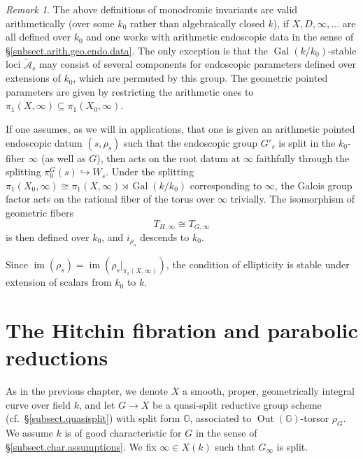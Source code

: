 \documentclass[openany]{amsbook}
\theoremstyle{definition}
\theoremstyle{remark}
\newtheorem{remark}[theorem]{Remark}
\numberwithin{equation}{section}
\newcommand{\G}{\mathbb{G}}
\newcommand{\cA}{\mathcal{A}}
\newcommand{\im}{\operatorname{im}}
\newcommand{\Gal}{\operatorname{Gal}}
\renewcommand{\-}{\operatorname{-}}
\newcommand{\Out}{\operatorname{Out}}
\newcommand{\ctA}{\widetilde{\cA}}
\begin{document}
\begin{remark}\label{rmk.arith.geo.data.correspond}
The above definitions of monodromic invariants are valid arithmetically (over some $k_0$ rather than algebraically closed $k$), if $X, D, \infty, \ldots$ are all defined over $k_0$ and one works with arithmetic endoscopic data in the sense of \S \ref{subsect.arith.geo.endo.data}. The only exception is that the $\Gal(k/k_0)$-stable loci $\ctA_s$ may consist of several components for endoscopic parameters defined over extensions of $k_0$, which are permuted by this group. The geometric pointed parameters are given by restricting the arithmetic ones to $\pi_1(X, \infty) \subseteq \pi_1(X_0, \infty)$. 

If one assumes, as we will in applications, that one is given an arithmetic pointed endoscopic datum $(s, \rho_s)$ such that the endoscopic group $G'_s$ is split in the $k_0$-fiber $\infty$ (as well as $G$), then acts on the root datum at $\infty$ faithfully through the splitting $\pi_0^G(s) \hookrightarrow W_s$. Under the splitting $\pi_1(X_0, \infty) \cong \pi_1(X, \infty) \rtimes \Gal(k/k_0)$ corresponding to $\infty$, the Galois group factor acts on the rational fiber of the torus over $\infty$ trivially. The isomorphism of geometric fibers $$T_{H, \infty} \cong T_{G, \infty}$$ is then defined over $k_0$, and $i_{\rho_s}$ descends to $k_0$.

Since $\im(\rho_s) = \im(\rho_s|_{\pi_1(X, \infty)})$, the condition of ellipticity is stable under extension of scalars from $k_0$ to $k$. 
\end{remark}
















\chapter{The Hitchin fibration and parabolic reductions}\label{sect.Hitchin.fib}

As in the previous chapter, we denote $X$ a smooth, proper, geometrically integral curve over field $k$, and let $G \to X$ be a quasi-split reductive group scheme (cf.\ \S \ref{subsect.quasisplit}) with split form $\G$, associated to $\Out(\G)$-torsor $\rho_G$. We assume $k$ is of good characteristic for $G$ in the sense of \S \ref{subsect.char.assumptions}. We fix $\infty \in X(k)$ such that $G_\infty$ is split.
\end{document}

